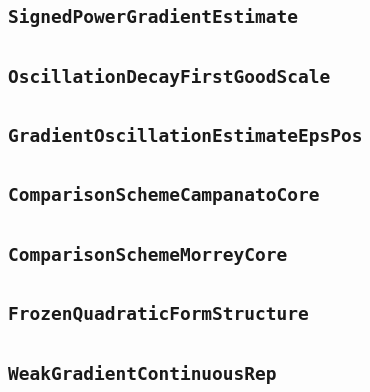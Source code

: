 \documentclass[11pt]{amsart}
\theoremstyle{definition}
\begin{document}
\subsection{\texorpdfstring{\texttt{SignedPowerGradientEstimate}}{SignedPowerGradientEstimate}}\label{node:SignedPowerGradientEstimate}


\subsection{\texorpdfstring{\texttt{OscillationDecayFirstGoodScale}}{OscillationDecayFirstGoodScale}}\label{node:OscillationDecayFirstGoodScale}


\subsection{\texorpdfstring{\texttt{GradientOscillationEstimateEpsPos}}{GradientOscillationEstimateEpsPos}}\label{node:GradientOscillationEstimateEpsPos}


\subsection{\texorpdfstring{\texttt{ComparisonSchemeCampanatoCore}}{ComparisonSchemeCampanatoCore}}\label{node:ComparisonSchemeCampanatoCore}


\subsection{\texorpdfstring{\texttt{ComparisonSchemeMorreyCore}}{ComparisonSchemeMorreyCore}}\label{node:ComparisonSchemeMorreyCore}


\subsection{\texorpdfstring{\texttt{FrozenQuadraticFormStructure}}{FrozenQuadraticFormStructure}}\label{node:FrozenQuadraticFormStructure}


\subsection{\texorpdfstring{\texttt{WeakGradientContinuousRep}}{WeakGradientContinuousRep}}\label{node:WeakGradientContinuousRep}

\end{document}

